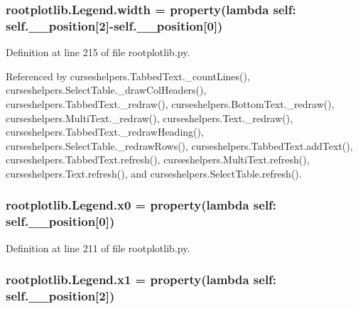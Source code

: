 \subsubsection[{width}]{\setlength{\rightskip}{0pt plus 5cm}rootplotlib.\-Legend.\-width = property(lambda self\-: self.\-\_\-\-\_\-position\mbox{[}2\mbox{]}-\/self.\-\_\-\-\_\-position\mbox{[}0\mbox{]})\hspace{0.3cm}{\ttfamily [static]}}\label{classrootplotlib_1_1Legend_a5b2f4e734af3ca094299e92506e899f4}


Definition at line 215 of file rootplotlib.\-py.



Referenced by curseshelpers.\-Tabbed\-Text.\-\_\-count\-Lines(), curseshelpers.\-Select\-Table.\-\_\-draw\-Col\-Headers(), curseshelpers.\-Tabbed\-Text.\-\_\-redraw(), curseshelpers.\-Bottom\-Text.\-\_\-redraw(), curseshelpers.\-Multi\-Text.\-\_\-redraw(), curseshelpers.\-Text.\-\_\-redraw(), curseshelpers.\-Tabbed\-Text.\-\_\-redraw\-Heading(), curseshelpers.\-Select\-Table.\-\_\-redraw\-Rows(), curseshelpers.\-Tabbed\-Text.\-add\-Text(), curseshelpers.\-Tabbed\-Text.\-refresh(), curseshelpers.\-Multi\-Text.\-refresh(), curseshelpers.\-Text.\-refresh(), and curseshelpers.\-Select\-Table.\-refresh().

\subsubsection[{x0}]{\setlength{\rightskip}{0pt plus 5cm}rootplotlib.\-Legend.\-x0 = property(lambda self\-: self.\-\_\-\-\_\-position\mbox{[}0\mbox{]})\hspace{0.3cm}{\ttfamily [static]}}\label{classrootplotlib_1_1Legend_ac8334bbd6f73d5138565aa76e6bb1709}


Definition at line 211 of file rootplotlib.\-py.

\subsubsection[{x1}]{\setlength{\rightskip}{0pt plus 5cm}rootplotlib.\-Legend.\-x1 = property(lambda self\-: self.\-\_\-\-\_\-position\mbox{[}2\mbox{]})\hspace{0.3cm}{\ttfamily [static]}}\label{classrootplotlib_1_1Legend_a83d5ffe9d0ef8d0effd0c1555c64766c}


